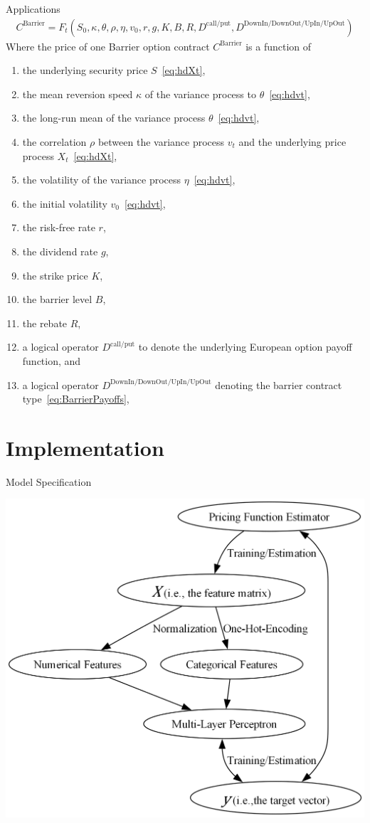 \documentclass[aspectratio=169,xcolor=dvipsnames]{beamer}
\begin{document}
		\begin{frame}{Applications}
			\begin{align}
				C^{\text{Barrier}} = F_{t}(S_0, \kappa, \theta, \rho, \eta, v_{0}, r, g, K, B, R, D^{\text{call/put}}, D^{\text{DownIn/DownOut/UpIn/UpOut}}) \label{eq:Cbarrier}
			\end{align}
			\vfill
			Where the price of one Barrier option contract $C^{\text{Barrier}}$ is a function of
			\begin{enumerate}
				\small
				\item the underlying security price $S$~\eqref{eq:hdXt}, 
				\item the mean reversion speed $\kappa$ of the variance process to $\theta$~\eqref{eq:hdvt}, 
				\item the long-run mean of the variance process $\theta$~\eqref{eq:hdvt}, 
				\item the correlation $\rho$ between the variance process $v_t$ and the underlying price process $X_t$~\eqref{eq:hdXt}, 
				\item the volatility of the variance process $\eta$~\eqref{eq:hdvt}, 
				\item the initial volatility $v_{0}$~\eqref{eq:hdvt}, 
				\item the risk-free rate $r$, 
				\item the dividend rate $g$, 
				\item the strike price $K$, 
				\item the barrier level $B$, 
				\item the rebate $R$, 
				\item a logical operator $D^{\text{call/put}}$ to denote the underlying European option payoff function, and
				\item a logical operator $D^{\text{DownIn/DownOut/UpIn/UpOut}}$ denoting the barrier contract type~\eqref{eq:BarrierPayoffs},
			\end{enumerate}
		\end{frame}
	
	\section{Implementation}
	
		\begin{frame}{Model Specification}
			\begin{center}
				\includegraphics[width=0.5\linewidth]{../../images/MLP.png}
			\end{center}
		\end{frame}
	
\end{document}
